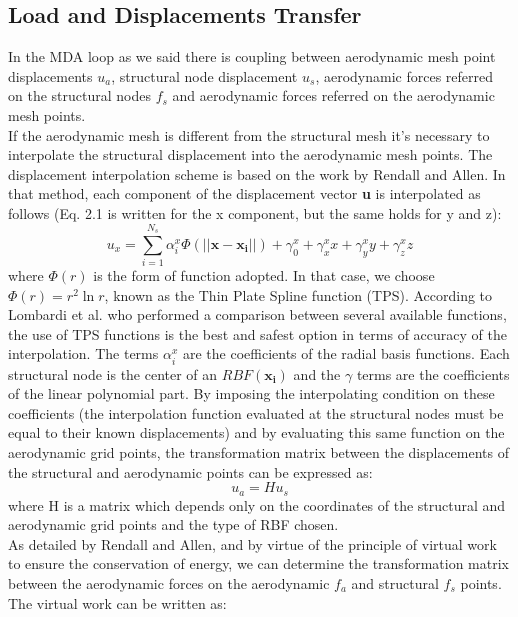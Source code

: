 \subsection{Load and Displacements Transfer}
In the MDA loop as we said there is coupling between aerodynamic mesh point displacements $u_a$, structural node displacement $u_s$, aerodynamic forces referred on the structural nodes $f_s$ and aerodynamic forces referred on the aerodynamic mesh points.\\
If the aerodynamic mesh is different from the structural mesh it's necessary to interpolate the structural displacement into the aerodynamic mesh points. The displacement interpolation scheme  is based on the work by Rendall and Allen. \cite{all} In that method, each component of the displacement vector \textbf{u} is interpolated as follows (Eq. 2.1 is written for the x component, but the same holds for y and z):
\begin{equation}
u_x=\sum_{i=1}^{N_s}\alpha_i^x\Phi\left(\vert\vert \mathbf{x}-\mathbf{x_i}\vert \vert\right)+\gamma_0^x+\gamma_x^x x+\gamma_y^x y + \gamma_z^x z 
\end{equation}
where $\Phi(r)$ is the form of function adopted. In that case, we choose $\Phi(r)=r^2\ln r$, known as the Thin Plate Spline function (TPS).\cite{joan} According to Lombardi et al. \cite{lomb} who performed a comparison between several available functions, the use of TPS functions is the best and safest option in terms of accuracy of the interpolation. The terms $\alpha_i^x$ are the coefficients of the radial basis functions. Each structural node is the center of an $RBF (\mathbf{x_i})$ and the $\gamma$ terms are the coefficients of the linear polynomial part. By imposing the interpolating condition on these coefficients (the interpolation function evaluated at the structural nodes must be equal to their known displacements) and by evaluating this same function on the aerodynamic grid points, the transformation matrix between the displacements of the structural and aerodynamic points can be expressed as: 
\begin{equation}
u_a=H u_s
\end{equation}
where H is a matrix which depends only on the coordinates of the structural and aerodynamic grid points and the type of RBF chosen.\\
As detailed by Rendall and Allen,\cite{all} and by virtue of the principle of virtual work to ensure the conservation of energy, we can determine the transformation matrix between the aerodynamic forces on the aerodynamic $f_a$ and structural $f_s$ points. The virtual work can be written as:
